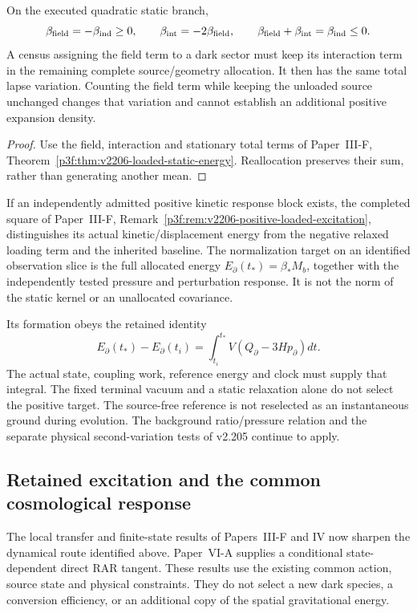 \documentclass[12pt,a4paper]{article}
\begin{document}
\begin{proposition}
\label{p9:prop:v2206-field-only-compensation}
On the executed quadratic static branch,
\[
 \beta_{\rm field}=-\beta_{\rm ind}\ge0,\qquad
 \beta_{\rm int}=-2\beta_{\rm field},\qquad
 \beta_{\rm field}+\beta_{\rm int}=\beta_{\rm ind}\le0.
\]
A census assigning the field term to a dark sector must keep its
interaction term in the remaining complete source/geometry allocation.
It then has the same total lapse variation. Counting the field term while
keeping the unloaded source unchanged changes that variation and cannot
establish an additional positive expansion density.
\end{proposition}
\begin{proof}
Use the field, interaction and stationary total terms of
Paper~III-F, Theorem~\ref{p3f:thm:v2206-loaded-static-energy}.
Reallocation preserves their sum, rather than generating another mean.
\end{proof}

\begin{remark}
\label{p9:rem:v2206-positive-history-target}
If an independently admitted positive kinetic response block exists,
the completed square of Paper~III-F,
Remark~\ref{p3f:rem:v2206-positive-loaded-excitation}, distinguishes
its actual kinetic/displacement energy from the negative relaxed
loading term and the inherited baseline. The normalization target on
an identified observation slice is the full allocated energy
$E_\partial(t_*)=\beta_*M_b$, together with the independently tested
pressure and perturbation response. It is not the norm of the static
kernel or an unallocated covariance.

Its formation obeys the retained identity
\[
 E_\partial(t_*)-E_\partial(t_i)
 =\int_{t_i}^{t_*}V(Q_\partial-3Hp_\partial)dt.
\]
The actual state, coupling work, reference energy and clock must supply
that integral. The fixed terminal vacuum and a static relaxation alone
do not select the positive target. The source-free reference is not
reselected as an instantaneous ground during evolution. The background
ratio/pressure relation and the separate physical second-variation tests
of v2.205 continue to apply.
\end{remark}


\subsection{Retained excitation and the common cosmological response}
\label{p9:sec:v2209-retained-state-output}
The local transfer and finite-state results of Papers~III-F and IV now
sharpen the dynamical route identified above. Paper~VI-A supplies a
conditional state-dependent direct RAR tangent. These results use the
existing common action, source state and physical constraints. They do
not select a new dark species, a conversion efficiency, or an additional
copy of the spatial gravitational energy.
\end{document}
